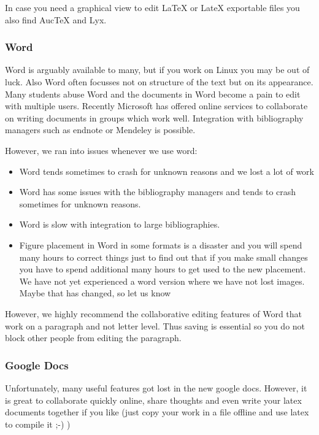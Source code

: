 In case you need a graphical view to edit LaTeX or LateX exportable
files you also find AucTeX and Lyx.

\subsubsection{Word}\label{word}

Word is arguably available to many, but if you work on Linux you may be
out of luck. Also Word often focusses not on structure of the text but
on its appearance. Many students abuse Word and the documents in Word
become a pain to edit with multiple users. Recently Microsoft has
offered online services to collaborate on writing documents in groups
which work well. Integration with bibliography managers such as endnote
or Mendeley is possible.

However, we ran into issues whenever we use word:

\begin{itemize}

\item
  Word tends sometimes to crash for unknown reasons and we lost a lot of
  work
\item
  Word has some issues with the bibliography managers and tends to crash
  sometimes for unknown reasons.
\item
  Word is slow with integration to large bibliographies.
\item
  Figure placement in Word in some formats is a disaster and you will
  spend many hours to correct things just to find out that if you make
  small changes you have to spend additional many hours to get used to
  the new placement. We have not yet experienced a word version where we
  have not lost images. Maybe that has changed, so let us know
\end{itemize}

However, we highly recommend the collaborative editing features of Word
that work on a paragraph and not letter level. Thus saving is essential
so you do not block other people from editing the paragraph.

\subsubsection{Google Docs}\label{google-docs}

Unfortunately, many useful features got lost in the new google docs.
However, it is great to collaborate quickly online, share thoughts and
even write your latex documents together if you like (just copy your
work in a file offline and use latex to compile it ;-) )

